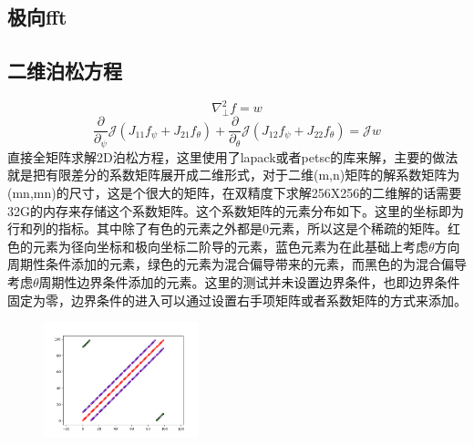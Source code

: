 \documentclass[11pt,a4paper]{article}
\begin{document}
\subsection{极向fft}
	\begin{figure}[H]
	\centering
	\caption{}
	\end{figure}

\subsection{二维泊松方程}
$$ \nabla_\perp^2 f = w $$
$$
\frac{\partial}{\partial_\psi}\mathcal{J}(J_{11}f_\psi + J_{21}f_\theta)+\frac{\partial}{\partial_\theta}\mathcal{J}(J_{12}f_\psi + J_{22}f_\theta) = {\mathcal{J}}w 
$$
直接全矩阵求解2D泊松方程，这里使用了lapack或者petsc的库来解，主要的做法就是把有限差分的系数矩阵展开成二维形式，对于二维(m,n)矩阵的解系数矩阵为(mn,mn)的尺寸，这是个很大的矩阵，在双精度下求解256X256的二维解的话需要32G的内存来存储这个系数矩阵。这个系数矩阵的元素分布如下。这里的坐标即为行和列的指标。其中除了有色的元素之外都是0元素，所以这是个稀疏的矩阵。红色的元素为径向坐标和极向坐标二阶导的元素，蓝色元素为在此基础上考虑$\theta$方向周期性条件添加的元素，绿色的元素为混合偏导带来的元素，而黑色的为混合偏导考虑$\theta$周期性边界条件添加的元素。这里的测试并未设置边界条件，也即边界条件固定为零，边界条件的进入可以通过设置右手项矩阵或者系数矩阵的方式来添加。
\begin{figure}[H]
	\centering
	\includegraphics[width=0.4\textwidth]{../psi-code/test_06/coef.png}
	\caption{}
\end{figure}
\end{document}
